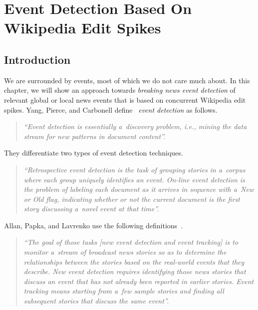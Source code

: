 

\chapter{Event Detection Based On Wikipedia Edit Spikes}
\label{cha:eventdetection}

\ifpdf
    \graphicspath{{10_event_detection/figures/PNG/}{10_event_detection/figures/PDF/}{10_event_detection/figures/}}
\else
    \graphicspath{{10_event_detection/figures/EPS/}{10_event_detection/figures/}}
\fi

\section{Introduction}

We are surrounded by events, most of which we do not care much about.
In this chapter, we will show an approach towards
\emph{breaking news event detection}
of relevant global or local news events
that is based on concurrent Wikipedia edit spikes.
Yang, Pierce, and Carbonell define~\cite{yang1998eventdetection} \emph{event detection} as follows.

\begin{quotation}
  \textit{``Event detection is essentially a~discovery problem,  
  \emph{i.e.}, mining the data stream for new patterns in document content''.}
\end{quotation}

They differentiate two types of event detection techniques.

\begin{quotation}
  \textit{``\emph{Retrospective} event detection is the task of grouping stories
  in a~corpus where each group uniquely identifies an event.
  \emph{On-line} event detection is the problem of labeling
  each document as it arrives in sequence with a~New or Old flag,
  indicating whether or not the current document is the
  first story discussing a~novel event at that time''.}
\end{quotation}

Allan, Papka, and Lavrenko use the following definitions~\cite{allan1998eventdetection}.

\begin{quotation}
  \textit{``The goal of those tasks [new event detection and event tracking]
  is to monitor a~stream of broadcast news stories
  so as to determine the relationships between the stories
  based on the real-world events that they describe.
  \emph{New event detection} requires identifying those news stories
  that discuss an event that has not already been reported in earlier stories.
  \emph{Event tracking} means starting from a~few sample stories
  and  finding all subsequent stories that discuss the same event''.}
\end{quotation}

